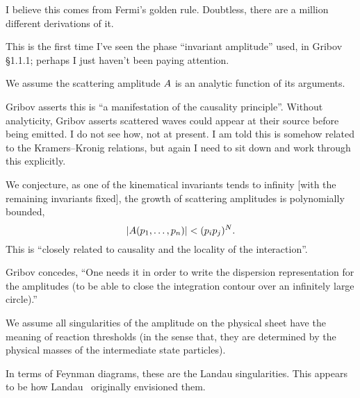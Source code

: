 I believe this comes from Fermi's golden rule. Doubtless, there are a
million different derivations of it.

 This is the first time I've seen the
phase ``invariant amplitude'' used, in Gribov \S1.1.1; perhaps I just
haven't been paying attention.

We assume the scattering amplitude $A$ is an analytic function
of its arguments.

\M[1]
Gribov asserts this is ``a manifestation of the causality principle''.
Without analyticity, Gribov asserts scattered waves could appear at
their source before being emitted. I do not see how, not at present.
I am told this is somehow related to the Kramers--Kronig relations, but
again I need to sit down and work through this explicitly.

We conjecture, as one of the kinematical invariants tends to infinity
[with the remaining invariants fixed],
the growth of scattering amplitudes is polynomially bounded,
\begin{equation}
|A(p_{1},\dots,p_{n})|<(p_{i}p_{j})^{N}.
\end{equation}
This is ``closely related to causality and the locality of the interaction''.

Gribov concedes, ``One needs it in order to write the dispersion representation
for the amplitudes (to be able to close the integration contour over an
infinitely large circle).''

We assume all singularities of the amplitude on the physical sheet have
the meaning of reaction thresholds (in the sense that, they are
determined by the physical masses of the intermediate state particles).

In terms of Feynman diagrams, these are the Landau singularities. This
appears to be how Landau~\cite{Landau:1959fi} originally envisioned them.

